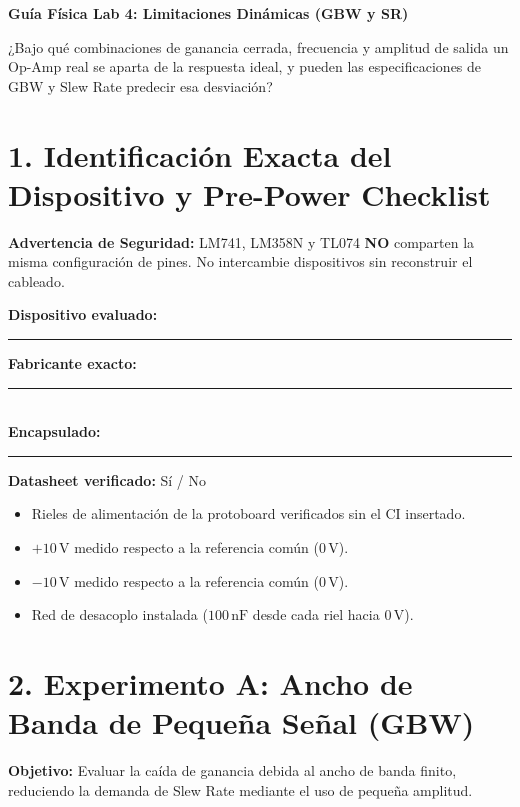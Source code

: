 \documentclass[11pt, a4paper]{article}
\begin{document}
\begin{center}
    \Large\textbf{\textcolor{ucbblue}{Guía Física Lab 4: Limitaciones Dinámicas (GBW y SR)}}
\end{center}

\begin{tcolorbox}[colback=ucbblue!5, colframe=ucbblue, title=\textbf{Pregunta Experimental Central}]
    ¿Bajo qué combinaciones de ganancia cerrada, frecuencia y amplitud de salida un Op-Amp real se aparta de la respuesta ideal, y pueden las especificaciones de GBW y Slew Rate predecir esa desviación?
\end{tcolorbox}

\section*{1. Identificación Exacta del Dispositivo y Pre-Power Checklist}
\begin{sloppypar}
\textbf{Advertencia de Seguridad:} LM741, LM358N y TL074 \textbf{NO} comparten la misma configuración de pines. No intercambie dispositivos sin reconstruir el cableado.
\end{sloppypar}

\vspace{0.2cm}
\textbf{Dispositivo evaluado:} \rule{4cm}{0.4pt} \textbf{Fabricante exacto:} \rule{4cm}{0.4pt} \\
\textbf{Encapsulado:} \rule{3cm}{0.4pt} \textbf{Datasheet verificado:} Sí / No

\begin{itemize}
    \setlength{\itemsep}{0pt}
    \item[$\square$] Rieles de alimentación de la protoboard verificados sin el CI insertado.
    \item[$\square$] $+10\,\text{V}$ medido respecto a la referencia común ($0\,\text{V}$).
    \item[$\square$] $-10\,\text{V}$ medido respecto a la referencia común ($0\,\text{V}$).
    \item[$\square$] Red de desacoplo instalada ($100\,\text{nF}$ desde cada riel hacia $0\,\text{V}$).
\end{itemize}

\section*{2. Experimento A: Ancho de Banda de Pequeña Señal (GBW)}
\textbf{Objetivo:} Evaluar la caída de ganancia debida al ancho de banda finito, reduciendo la demanda de Slew Rate mediante el uso de pequeña amplitud.
\end{document}

